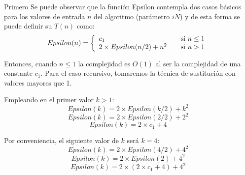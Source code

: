 Primero
Se puede observar que la función Epsilon contempla dos casos básicos para los valores de entrada $n$ del algoritmo (parámetro $iN$) y de esta forma se puede definir su $T(n)$ como:
\begin{equation}
Epsilon(n) = \left\{
  \begin{array}{l l}
    c_1 & \quad \text{si $n \le 1$}\\
    2 \times Epsilon(n/2) + n^2& \quad \text{si $n > 1$}
  \end{array} \right.
\end{equation}

Entonces, cuando $n \le 1$ la complejidad es $O(1)$ al ser la complejidad de una constante $c_1$. Para el caso recursivo, tomaremos la técnica de sustitución con valores mayores que 1.

Empleando en el primer valor $k > 1$:
$$Epsilon(k) = 2 \times Epsilon(k/2) + k^2$$
$$Epsilon(k) = 2 \times Epsilon(2/2) + 2^2$$
$$Epsilon(k) = 2 \times c_1 + 4$$

Por conveniencia, el siguiente valor de $k$ será $k=4$:
$$Epsilon(k) = 2 \times Epsilon(4/2) + 4^2$$
$$Epsilon(k) = 2 \times Epsilon(2) + 4^2$$
 $$Epsilon(k) = 2 \times (2 \times c_1 + 4) + 4^2$$
